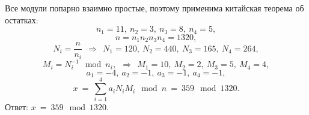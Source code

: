 Все модули попарно взаимно простые, поэтому применима китайская теорема об остатках:
    \[ n_1 = 11, ~ n_2 = 3, ~ n_3 = 8, ~ n_4 = 5, \]
    \[ n = n_1 n_2 n_3 n_4 = 1320, \]
    \[ N_i = \frac{n}{n_i} ~~ \Rightarrow ~~ N_1 = 120, ~ N_2 = 440, ~ N_3 = 165, ~ N_4 = 264, \]
    \[ M_i = N_i^{-1} \mod n_i, ~~ \Rightarrow ~~ M_1 = 10, ~ M_2 = 2, ~ M_3 = 5, ~ M_4 = 4, \]
    \[ a_1 = -4, ~ a_2 = -1, ~ a_3 = -1, ~ a_4 = -1, \]
    \[ x ~=~ \sum_{i=1}^4 a_i N_i M_i \mod n ~=~ 359 \mod 1320. \]
Ответ: $x ~=~ 359 \mod 1320$.
\exampleend
